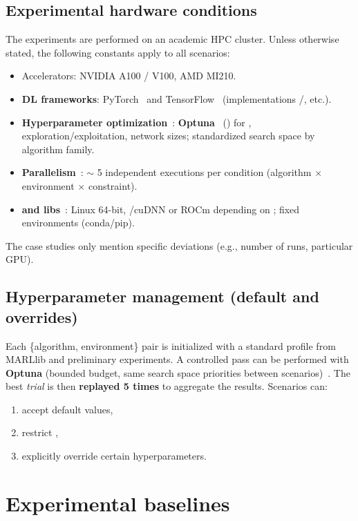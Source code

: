 \subsection{Experimental hardware conditions}
\label{par:compute_conditions}
The experiments are performed on an academic HPC cluster. Unless otherwise stated, the following constants apply to all scenarios:
\begin{itemize}
  \item Accelerators: NVIDIA A100 / V100, AMD MI210.
  \item \textbf{DL frameworks}: PyTorch~\cite{Paszke2019} and TensorFlow~\cite{Abadi2016} (implementations /, etc.).
  \item \textbf{Hyperparameter optimization}~: \textbf{Optuna}~\cite{akiba2019optuna} () for , exploration/exploitation, network sizes; standardized search space by algorithm family.
  \item \textbf{Parallelism}~: $\sim$ 5 independent executions per condition (algorithm $\times$ environment $\times$ constraint).
  \item \textbf{ and libs}~: Linux 64-bit, /cuDNN or ROCm depending on ; fixed environments (conda/pip).
\end{itemize}
The case studies only mention specific deviations (e.g., number of runs, particular GPU).

\subsection{Hyperparameter management (default and overrides)}
Each \{algorithm, environment\} pair is initialized with a standard profile from MARLlib and preliminary experiments.
A controlled  pass can be performed with \textbf{Optuna} (bounded budget, same search space priorities between scenarios)~\cite{akiba2019optuna}. The best \textit{trial} is then \textbf{replayed 5 times} to aggregate the results.
Scenarios can:
\begin{enumerate}[label=\alph*)]
  \item accept default values,
  \item restrict ,
  \item explicitly override certain hyperparameters.
\end{enumerate}

\section{Experimental baselines}

